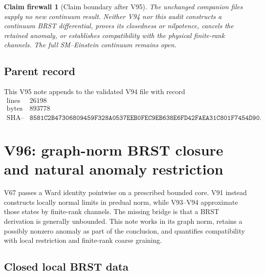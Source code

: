 \documentclass[11pt]{article}
\newtheorem{firewall}[theorem]{Claim firewall}
\theoremstyle{remark}
\begin{document}
\begin{firewall}[Claim boundary after V95]
\label{fire:v12v95-claim}
The unchanged companion files supply no new continuum result.
Neither V94 nor this audit constructs a continuum BRST differential,
proves its closedness or nilpotence, cancels the retained anomaly,
or establishes compatibility with the physical finite-rank
channels.  The full SM--Einstein continuum remains open.
\end{firewall}

\subsection{Parent record}

This V95 note appends to the validated V94 file with record
\[
\begin{array}{c|c}
\text{lines}&26198\\
\text{bytes}&893778\\
\text{SHA--256}&
\texttt{8581C2B47306809459F328A0537EEB0FEC9EB638E6FD42FAEA31C801F7454D90}.
\end{array}
\]



\section{V96: graph-norm BRST closure and natural anomaly
restriction}
\label{sec:v12v96}

V67 passes a Ward identity pointwise on a prescribed bounded core.
V91 instead constructs locally normal limits in predual norm, while
V93--V94 approximate those states by finite-rank channels.  The
missing bridge is that a BRST derivation is generally unbounded.
This note works in its graph norm, retains a possibly nonzero anomaly
as part of the conclusion, and quantifies compatibility with local
restriction and finite-rank coarse graining.

\subsection{Closed local BRST data}
\end{document}
